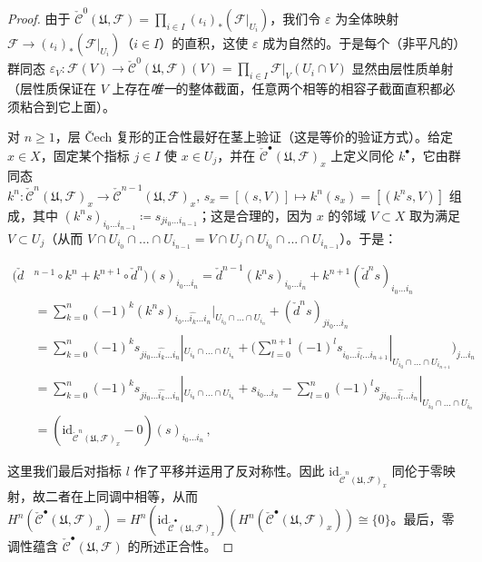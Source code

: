 \begin{proof}
由于 $\check{\mathcal{C}}^0(\mathfrak{U},\mathcal{F})=\prod_{i\in I} (\iota_i)_*(\mathcal{F}|_{U_i})$，我们令 $\varepsilon$ 为全体映射 $\mathcal{F}\rightarrow (\iota_i)_*(\mathcal{F}|_{U_i})$（$i\in I$）的直积，这使 $\varepsilon$ 成为自然的。于是每个（非平凡的）群同态 $\varepsilon_V:\mathcal{F}(V)\rightarrow \check{\mathcal{C}}^0(\mathfrak{U},\mathcal{F})(V)=\prod_{i\in I} \mathcal{F}|_V(U_i\cap V)$ 显然由层性质单射（层性质保证在 $V$ 上存在\textit{唯一}的整体截面，任意两个相等的相容子截面直积都必须粘合到它上面）。

对 $n\geq 1$，层 \v{C}ech 复形的正合性最好在茎上验证（这是等价的验证方式）。给定 $x\in X$，固定某个指标 $j\in I$ 使 $x\in U_j$，并在 $\check{\mathcal{C}}^\bullet(\mathfrak{U},\mathcal{F})_x$ 上定义同伦 $k^\bullet$，它由群同态 $k^n:\check{\mathcal{C}}^n(\mathfrak{U},\mathcal{F})_x\rightarrow \check{\mathcal{C}}^{n-1}(\mathfrak{U},\mathcal{F})_x,\, s_x=[(s,V)]\mapsto k^n(s_x)=[(k^ns,V)]$ 组成，其中 $(k^ns)_{i_0...i_{n-1}}\coloneqq s_{ji_0...i_{n-1}}$；这是合理的，因为 $x$ 的邻域 $V\subset X$ 取为满足 $V\subset U_j$（从而 $V\cap U_{i_0}\cap...\cap U_{i_{n-1}}=V\cap U_j\cap U_{i_0}\cap...\cap U_{i_{n-1}}$）。于是：
\begingroup
\allowdisplaybreaks
\begin{small}\begin{align*}
		(\check{d}&^{n-1}\circ k^n + k^{n+1}\circ \check{d}^n)(s)_{i_0...i_n} = \check{d}^{n-1}(k^ns)_{i_0...i_n} + k^{n+1}(\check{d}^ns)_{i_0...i_n} \\
		&= \sum_{k=0}^n(-1)^k(k^ns)_{i_0...\hat{i_k}...i_n}|_{U_{i_0}\cap...\cap U_{i_n}} + (\check{d}^ns)_{ji_0...i_n} \\
		&= \sum_{k=0}^n(-1)^k s_{ji_0...\hat{i_k}...i_n}|_{U_{i_0}\cap...\cap U_{i_n}} \!+\! \Big(\sum_{l=0}^{n+1}(-1)^l s_{i_0...\hat{i_l}...i_{n+1}}|_{U_{i_0}\cap...\cap U_{i_{n+1}}}\Big)_{\!j...i_n} \\
		&= \sum_{k=0}^n(-1)^k s_{ji_0...\hat{i_k}...i_n}|_{U_{i_0}\cap...\cap U_{i_n}} \!+\! s_{i_0...i_n} \!-\! \sum_{l=0}^n(-1)^l s_{ji_0...\hat{i_l}...i_n}|_{U_{i_0}\cap...\cap U_{i_n}} \\ 
		&= (\text{id}_{\check{\mathcal{C}}^n(\mathfrak{U},\mathcal{F})_x}-0)(s)_{i_0...i_n}\,, 
\end{align*}\end{small}
\endgroup
\!\!这里我们最后对指标 $l$ 作了平移并运用了反对称性。因此 $\text{id}_{\check{\mathcal{C}}^n(\mathfrak{U},\mathcal{F})_x}$ 同伦于零映射，故二者在上同调中相等，从而 $H^n(\check{\mathcal{C}}^\bullet(\mathfrak{U},\mathcal{F})_x)=H^n(\text{id}_{\check{\mathcal{C}}^\bullet(\mathfrak{U},\mathcal{F})_x})(H^n(\check{\mathcal{C}}^\bullet(\mathfrak{U},\mathcal{F})_x))\cong\{0\}$。最后，零调性蕴含 $\check{\mathcal{C}}^\bullet(\mathfrak{U},\mathcal{F})$ 的所述正合性。  
\end{proof}

